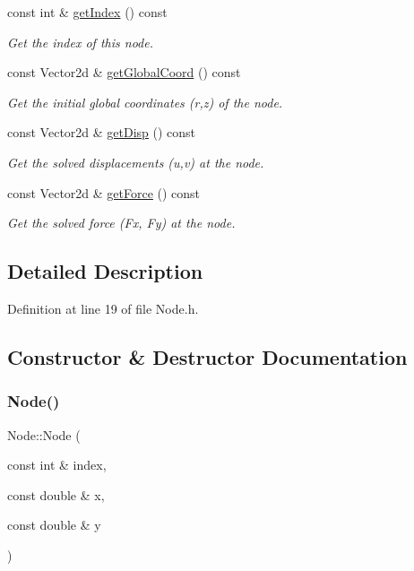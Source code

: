\begin{DoxyCompactItemize}
const int \& \mbox{\hyperlink{class_node_a8266479b3d82c502d7b4abc5afccb8c0}{get\+Index}} () const
\begin{DoxyCompactList}\small\item\em Get the index of this node. \end{DoxyCompactList}\item 
const Vector2d \& \mbox{\hyperlink{class_node_ab0129116eb1cff646bd53b8120cd34e6}{get\+Global\+Coord}} () const
\begin{DoxyCompactList}\small\item\em Get the initial global coordinates (r,z) of the node. \end{DoxyCompactList}\item 
const Vector2d \& \mbox{\hyperlink{class_node_a2024b690427f7840b18dc429d4acba7d}{get\+Disp}} () const
\begin{DoxyCompactList}\small\item\em Get the solved displacements (u,v) at the node. \end{DoxyCompactList}\item 
const Vector2d \& \mbox{\hyperlink{class_node_acb1728229a234694419ecda6ad5928c4}{get\+Force}} () const
\begin{DoxyCompactList}\small\item\em Get the solved force (Fx, Fy) at the node. \end{DoxyCompactList}\end{DoxyCompactItemize}


\subsection{Detailed Description}


Definition at line 19 of file Node.\+h.



\subsection{Constructor \& Destructor Documentation}
\mbox{\label{class_node_a7dd5e46921c9aa573f8167e1f3d0acaa}} 
\subsubsection{\texorpdfstring{Node()}{Node()}}
{\footnotesize\ttfamily Node\+::\+Node (\begin{DoxyParamCaption}\item[{const int \&}]{index,  }\item[{const double \&}]{x,  }\item[{const double \&}]{y }\end{DoxyParamCaption})}



